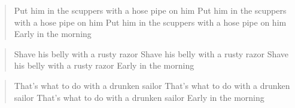\begin{verse}
    Put him in the scuppers with a hose pipe on him
    Put him in the scuppers with a hose pipe on him
    Put him in the scuppers with a hose pipe on him
    Early in the morning
\end{verse}

\begin{verse}
    Shave his belly with a rusty razor
    Shave his belly with a rusty razor
    Shave his belly with a rusty razor
    Early in the morning
\end{verse}

\begin{verse}
    That's what to do with a drunken sailor
    That's what to do with a drunken sailor
    That's what to do with a drunken sailor
    Early in the morning
\end{verse}

\endsong